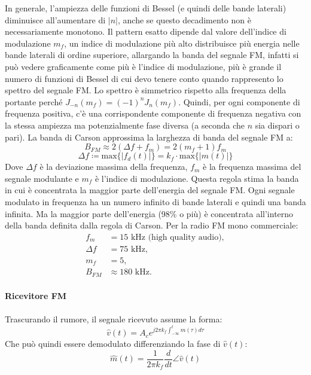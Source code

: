 In generale, l'ampiezza delle funzioni di Bessel (e quindi delle bande laterali) diminuisce all'aumentare di \( |n| \), anche se questo decadimento non è necessariamente monotono.
Il pattern esatto dipende dal valore dell'indice di modulazione \( m_f \), un indice di modulazione più alto distribuisce più energia nelle bande laterali di ordine superiore, allargando la banda del segnale FM,
infatti si può vedere graficamente come più è l'indice di modulazione, più è grande il numero di funzioni di Bessel di cui devo tenere conto quando rappresento lo spettro del segnale FM.
Lo spettro è simmetrico rispetto alla frequenza della portante perché \( J_{-n}(m_f) = (-1)^n J_n(m_f) \). Quindi, per ogni componente di frequenza positiva, c'è una corrispondente componente di frequenza negativa con la stessa ampiezza ma potenzialmente fase diversa (a seconda che \( n \) sia dispari o pari).
La banda di Carson approssima la larghezza di banda del segnale FM a:
\[
    B_{FM} \approx 2(\Delta f + f_{m}) = 2(m_f + 1) f_{m}
\]
\[
    \Delta f \coloneqq \text{max} \{ | f_d(t) | \} = k_f \cdot \text{max} \{ | m(t) | \}
\]
Dove \( \Delta f \) è la deviazione massima della frequenza, \( f_{m} \) è la frequenza massima del segnale modulante e \( m_f \) è l'indice di modulazione.
Questa regola stima la banda in cui è concentrata la maggior parte dell'energia del segnale FM.
Ogni segnale modulato in frequenza ha un numero infinito di bande laterali e quindi una banda infinita. Ma la maggior parte dell'energia (98\% o più) è concentrata all'interno della banda definita dalla regola di Carson. Per la radio FM mono commerciale:
\begin{align*}
    f_m      & = 15 \text{ kHz (high quality audio)}, \\
    \Delta f & = 75 \text{ kHz},                      \\
    m_f      & = 5,                                   \\
    B_{FM}   & \approx 180 \text{ kHz}.
\end{align*}

\paragraph*{Ricevitore FM}
Trascurando il rumore, il segnale ricevuto assume la forma:
\[
    \hat{v}(t) = A_c e^{j2\pi k_f \int_{-\infty}^{t} m(\tau) d\tau}
\]
Che può quindi essere demodulato differenziando la fase di \( \hat{v}(t) \):
\[
    \hat{m}(t) = \frac{1}{2\pi k_f} \frac{d}{dt} \angle \hat{v}(t)
\]


